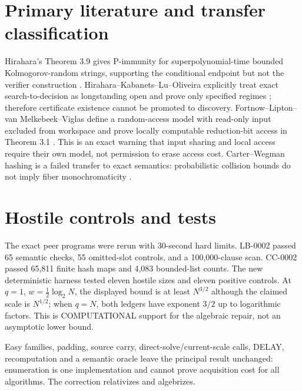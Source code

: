 \documentclass[11pt]{article}
\begin{document}
\section{Primary literature and transfer classification}
Hirahara's Theorem 3.9 gives P-immunity for superpolynomial-time bounded
Kolmogorov-random strings, supporting the conditional endpoint but not the
verifier construction \cite{hirahara}.  Hirahara--Kabanets--Lu--Oliveira
explicitly treat exact search-to-decision as longstanding open and prove
only specified regimes \cite{hklo}; therefore certificate existence cannot
be promoted to discovery.  Fortnow--Lipton--van Melkebeek--Viglas define a
random-access model with read-only input excluded from workspace and prove
locally computable reduction-bit access in Theorem 3.1 \cite{flmv}.  This is
an exact warning that input sharing and local access require their own model,
not permission to erase access cost.  Carter--Wegman hashing is a failed
transfer to exact semantics: probabilistic collision bounds do not imply
fiber monochromaticity \cite{cw}.

\section{Hostile controls and tests}
The exact peer programs were rerun with 30-second hard limits.  LB-0002
passed 65 semantic checks, 55 omitted-slot controls, and a 100,000-clause
scan.  CC-0002 passed 65,811 finite hash maps and 4,083 bounded-list counts.
The new deterministic harness tested eleven hostile sizes and eleven positive
controls.  At $q=1$, $w=\frac12\log_2N$, the displayed bound is at least
$N^{3/2}$ although the claimed scale is $N^{1/2}$; when $q=N$, both ledgers
have exponent $3/2$ up to logarithmic factors.  This is COMPUTATIONAL support
for the algebraic repair, not an asymptotic lower bound.

Easy families, padding, source carry, direct-solve/current-scale calls,
DELAY, recomputation and a semantic oracle leave the principal result
unchanged: enumeration is one implementation and cannot prove acquisition
cost for all algorithms.  The correction relativizes and algebrizes.
\end{document}
